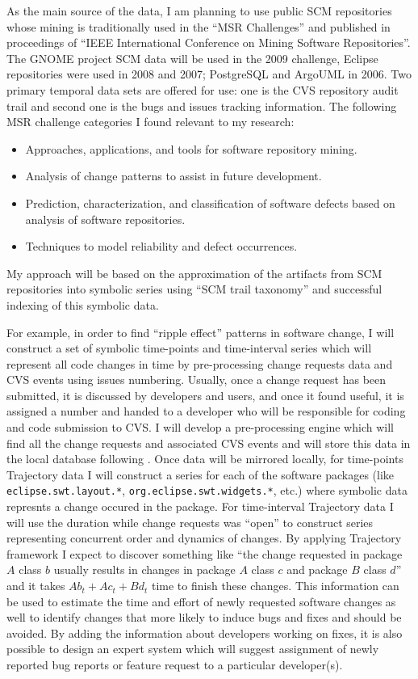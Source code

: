 As the main source of the data, I am planning to use public SCM repositories whose mining is traditionally used in the ``MSR Challenges'' \cite{citeulike:5043676} and published in proceedings of ``IEEE International Conference on Mining Software Repositories''. The GNOME project SCM data will be used in the 2009 challenge, Eclipse repositories were used in 2008 and 2007; PostgreSQL and ArgoUML in 2006. Two primary temporal data sets are offered for use: one is the CVS repository audit trail and second one is the bugs and issues tracking information. The following MSR challenge categories I found relevant to my research:
\begin{itemize}
  \item Approaches, applications, and tools for software repository mining.
  \item Analysis of change patterns to assist in future development.
	\item Prediction, characterization, and classification of software defects based on analysis of software repositories.
	\item Techniques to model reliability and defect occurrences.
\end{itemize}
My approach will be based on the approximation of the artifacts from SCM repositories into symbolic series using ``SCM trail taxonomy'' and successful indexing of this symbolic data. 

For example, in order to find ``ripple effect'' patterns in software change, I will construct a set of symbolic time-points and time-interval series which will represent all code changes in time by pre-processing change requests data and CVS events using issues numbering. Usually, once a change request has been submitted, it is discussed by developers and users, and once it found useful, it is assigned a number and handed to a developer who will be responsible for coding and code submission to CVS. I will develop a pre-processing engine which will find all the change requests and associated CVS events and will store this data in the local database following \cite{citeulike:5333719}. Once data will be mirrored locally, for time-points Trajectory data I will construct a series for each of the software packages (like \texttt{eclipse.swt.layout.*}, \texttt{org.eclipse.swt.widgets.*}, etc.) where symbolic data represnts a change occured in the package. For time-interval Trajectory data I will use the duration while change requests was ``open'' to construct series representing concurrent order and dynamics of changes. By applying Trajectory framework I expect to discover something like ``the change requested in package $A$ class $b$ usually results in changes in package $A$ class $c$ and package $B$ class $d$'' and it takes $Ab_{t} + Ac_{t} + Bd_{t}$ time to finish these changes. This information can be used to estimate the time and effort of newly requested software changes as well to identify changes that more likely to induce bugs and fixes and should be avoided. By adding the information about developers working on fixes, it is also possible to design an expert system which will suggest assignment of newly reported bug reports or feature request to a particular developer(s).

